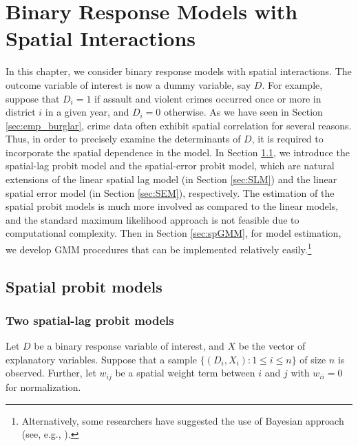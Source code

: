 \documentclass[11pt, A4paper, openany, uplatex]{book}
\begin{document}
\chapter{Binary Response Models with Spatial Interactions}\label{chap:binary}

In this chapter, we consider binary response models with spatial interactions.
The outcome variable of interest is now a dummy variable, say $D$.
For example, suppose that $D_i = 1$ if assault and violent crimes occurred once or more in district $i$ in a given year, and $D_i = 0$ otherwise.
As we have seen in Section \ref{sec:emp_burglar}, crime data often exhibit spatial correlation for several reasons.
Thus, in order to precisely examine the determinants of $D$, it is required to incorporate the spatial dependence in the model.
In Section \ref{sec:spprobit}, we introduce the spatial-lag probit model and the spatial-error probit model, which are natural extensions of the linear spatial lag model (in Section \ref{sec:SLM}) and the linear spatial error model (in Section \ref{sec:SEM}), respectively.
The estimation of the spatial probit models is much more involved as compared to the linear models, and the standard maximum likelihood approach is not feasible due to computational complexity.
Then in Section \ref{sec:spGMM}, for model estimation, we develop GMM procedures that can be implemented relatively easily.\footnote{
	Alternatively, some researchers have suggested the use of Bayesian approach (see, e.g., \cite{lesage2009introduction}).
	}
\section{Spatial probit models}\label{sec:spprobit}

\subsection{Two spatial-lag probit models}
Let $D$ be a binary response variable of interest, and $X$ be the vector of explanatory variables.
Suppose that a sample $\{(D_i,X_i): 1 \le i \le n\}$ of size $n$ is observed.
Further, let $w_{ij}$ be a spatial weight term between $i$ and $j$ with $w_{ii} = 0$ for normalization.
\end{document}
